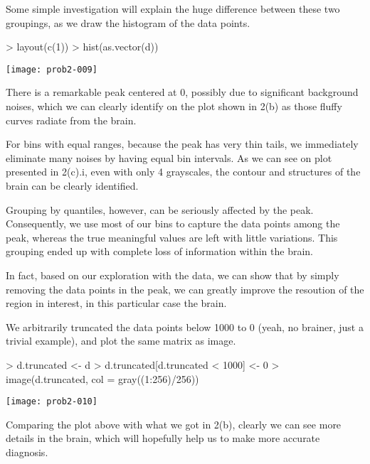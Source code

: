 \begin{enumerate}[(a)]
\begin{enumerate}[i.]
    Some simple investigation will explain the huge difference between these two groupings, as we draw the histogram of the data points. 
\begin{Schunk}
\begin{Sinput}
> layout(c(1))
> hist(as.vector(d))
\end{Sinput}
\end{Schunk}
\begin{center}
\texttt{[image: prob2-009]}
\end{center}

    There is a remarkable peak centered at 0, possibly due to significant background noises, which we can clearly identify on the plot shown in 2(b) as those fluffy curves radiate from the brain. 
    
    For bins with equal ranges, because the peak has very thin tails, we immediately eliminate many noises by having equal bin intervals. As we can see on plot presented in 2(c).i, even with only 4 grayscales, the contour and structures of the brain can be clearly identified. 
    
    Grouping by quantiles, however, can be seriously affected by the peak. Consequently, we use most of our bins to capture the data points among the peak, whereas the true meaningful values are left with little variations. This grouping ended up with complete loss of information within the brain. 

    In fact, based on our exploration with the data, we can show that by simply removing the data points in the peak, we can greatly improve the resoution of the region in interest, in this particular case the brain.

    We arbitrarily truncated the data points below 1000 to 0 (yeah, no brainer, just a trivial example), and plot the same matrix as image.
\begin{Schunk}
\begin{Sinput}
> d.truncated <- d
> d.truncated[d.truncated < 1000] <- 0
> image(d.truncated, col = gray((1:256)/256))
\end{Sinput}
\end{Schunk}
\texttt{[image: prob2-010]}

    Comparing the plot above with what we got in 2(b), clearly we can see more details in the brain, which will hopefully help us to make more accurate diagnosis.
    \end{enumerate}
\end{enumerate}
